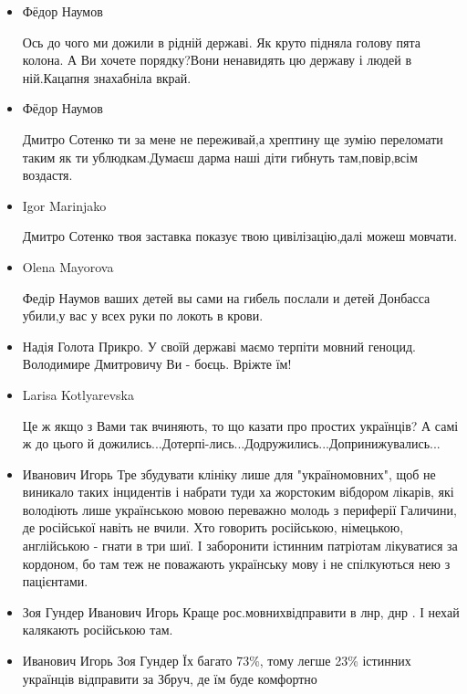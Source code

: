 \begin{itemize}
\item Фёдор Наумов

Ось до чого ми дожили в рідній державі. Як круто підняла голову пята колона. А
Ви хочете порядку?Вони ненавидять цю державу і людей в
ній.Кацапня знахабніла вкрай.

\item Фёдор Наумов

Дмитро Сотенко ти за мене не переживай,а хрептину ще зумію переломати таким як
ти ублюдкам.Думаєш дарма наші діти гибнуть там,повір,всім воздастя.

\item Igor Marinjako

Дмитро Сотенко твоя заставка показує твою цивілізацію,далі можеш мовчати.

\item Olena Mayorova

Федір Наумов ваших детей вы сами на гибель послали и детей Донбасса убили,у вас у всех руки по локоть в крови.

\item Надія Голота
Прикро. У своїй державі маємо терпіти мовний геноцид. Володимире Дмитровичу Ви - боєць. Вріжте їм!

\item Larisa Kotlyarevska

Це ж якщо з Вами так вчиняють, то що казати про простих українців? А самі ж до
цього й дожились...Дотерпі-лись...Додружились...Допринижувались...

\item Иванович Игорь
Тре збудувати клініку лише для "україномовних", щоб не виникало таких
інцидентів і набрати туди ха жорстоким вібдором лікарів, які
володіють лише українською мовою переважно молодь з периферії
Галичини, де російської навіть не вчили. Хто говорить
російською, німецькою, англійською - гнати в три шиї. І
заборонити істинним патріотам лікуватися за кордоном, бо там
теж не поважають українську мову і не спілкуються нею з
пацієнтами.

\item Зоя Гундер Иванович Игорь
Краще рос.мовнихвідправити в лнр, днр
. І нехай калякають російською там.

\item Иванович Игорь
Зоя Гундер
Їх багато 73\%, тому легше 23\% істинних українців відправити за Збруч, де їм буде комфортно

\end{itemize}

